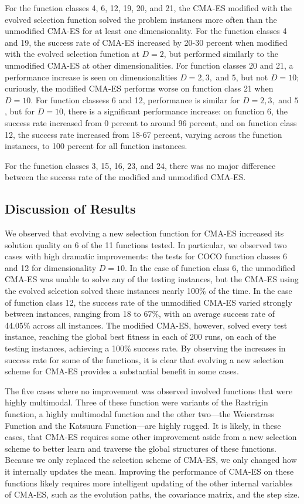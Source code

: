 \documentclass[sigconf]{acmart}
\begin{document}
For the function classes 4, 6, 12, 19, 20, and 21, the CMA-ES modified with the evolved selection function solved the problem instances more often than the unmodified CMA-ES for at least one dimensionality. For the function classes 4 and 19, the success rate of CMA-ES increased by 20-30 percent when modified with the evolved selection function at $D=2$, but performed similarly to the unmodified CMA-ES at other dimensionalities. For function classes 20 and 21, a performance increase is seen on dimensionalities $D=2, 3,$ and $5$, but not $D=10$; curiously, the modified CMA-ES performs worse on function class 21 when $D=10$. For function classess 6 and 12, performance is similar for $D=2, 3,$ and $5$, but for $D=10$, there is a significant performance increase: on function 6, the success rate increased from 0 percent to around 96 percent, and on function class 12, the success rate increased from 18-67 percent, varying across the function instances, to 100 percent for all function instances.

For the function classes 3, 15, 16, 23, and 24, there was no major difference between the success rate of the modified and unmodified CMA-ES. 

\subsection{Discussion of Results}
\label{resultsDiscussion}

We observed that evolving a new selection function for CMA-ES increased its solution quality on 6 of the 11 functions tested. In particular, we observed two cases with high dramatic improvements: the tests for COCO function classes 6 and 12 for dimensionality $D=10$. In the case of function class 6, the unmodified CMA-ES was unable to solve any of the testing instances, but the CMA-ES using the evolved selection solved these instances nearly 100\% of the time. In the case of function class 12, the success rate of the unmodified CMA-ES varied strongly between instances, ranging from 18 to 67\%, with an average success rate of 44.05\% across all instances. The modified CMA-ES, however, solved every test instance, reaching the global best fitness in each of 200 runs, on each of the testing instances, achieving a 100\% success rate. By observing the increases in success rate for some of the functions, it is clear that evolving a new selection scheme for CMA-ES provides a substantial benefit in some cases. 

The five cases where no improvement was observed involved functions that were highly multimodal. Three of these function were variants of the Rastrigin function, a highly multimodal function and the other two---the Weierstrass Function and the Katsuura Function---are highly rugged. It is likely, in these cases, that CMA-ES requires some other improvement aside from a new selection scheme to better learn and traverse the global structures of these functions. Because we only replaced the selection scheme of CMA-ES, we only changed how it internally updates the mean. Improving the performance of CMA-ES on these functions likely requires more intelligent updating of the other internal variables of CMA-ES, such as the evolution paths, the covariance matrix, and the step size.
\end{document}
